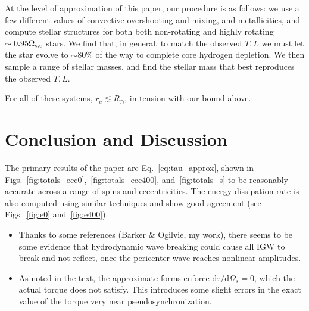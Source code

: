 \documentclass[
        fleqn,
        usenatbib,
        referee,
    ]{mnras}
\newcommand*{\rdil}[2]{\mathrm{d}#1 / \mathrm{d}#2}
\begin{document}
At the level of approximation of this paper, our procedure is as follows: we
use a few different values of convective overshooting and mixing, and
metallicities, and compute stellar structures for both both non-rotating and
highly rotating $\sim 0.95\Omega_{\rm s, c}$ stars. We find that, in general, to
match the observed $T, L$ we must let the star evolve to $\sim 80\%$ of the way
to complete core hydrogen depletion. We then sample a range of stellar masses,
and find the stellar mass that best reproduces the observed $T, L$.

For all of these systems, $r_c \lesssim R_{\odot}$, in tension with our bound
above.

\section{Conclusion and Discussion}\label{s:disc}

The primary results of the paper are Eq.~\eqref{eq:tau_approx}, shown in
Figs.~\ref{fig:totals_ecc0},~\ref{fig:totals_ecc400},
and~\ref{fig:totals_s} to be reasonably accurate across a range of spins
and eccentricities. The energy dissipation rate is also computed using similar
techniques and show good agreement (see Figs.~\ref{fig:e0}
and~\ref{fig:e400}).

\begin{itemize}
    \item Thanks to some references (Barker \& Ogilvie, my work), there seems to
        be some evidence that hydrodynamic wave breaking could cause all IGW to
        break and not reflect, once the pericenter wave reaches nonlinear
        amplitudes.

    \item As noted in the text, the approximate forms enforce
        $\rdil{\tau}{\Omega_s} = 0$, which the actual torque does not satisfy.
        This introduces some slight errors in the exact value of the torque very
        near pseudosynchronization.
\end{itemize}






\bsp
\label{lastpage} %
\end{document}

